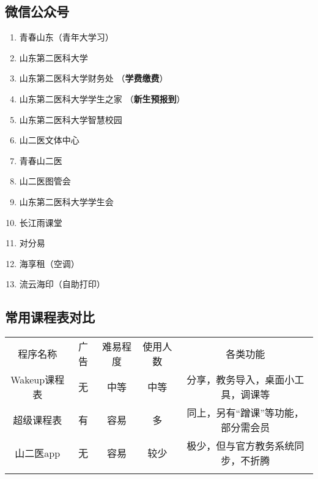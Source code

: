 {\begin{minipage}{.5\textwidth}
        \subsection[微信公众号]{微信公众号}
        \begin{enumerate}
            \item 青春山东（青年大学习）
            \item 山东第二医科大学
            \item 山东第二医科大学财务处%
                  （\textbf{学费缴费}）
            \item 山东第二医科大学学生之家%
                  （\textbf{新生预报到}）
            \item 山东第二医科大学智慧校园
            \item 山二医文体中心
            \item 青春山二医
            \item 山二医图管会
            \item 山东第二医科大学学生会
            \item 长江雨课堂
            \item 对分易
            \item 海享租（空调）
            \item 流云海印（自助打印）
        \end{enumerate}

    \end{minipage}
    \vspace*{-1em}
}

\subsection[常用课程表对比]{常用课程表对比}
\label{schedule}
\begin{center}
    \centering
    \begin{tabular}{|c|c|c|c|c|}
        \Xhline{1.2pt}
        程序名称      & 广告 & 难易程度 & 使用人数 & 各类功能               \\
        \Xhline{1.2pt}
        Wakeup课程表 & 无  & 中等   & 中等   & 分享，教务导入，桌面小工具，调课等  \\
        \hline
        超级课程表     & 有  & 容易   & 多    & 同上，另有“蹭课”等功能，部分需会员 \\
        \hline
        山二医app    & 无  & 容易   & 较少   & 极少，但与官方教务系统同步，不折腾  \\
        \Xhline{1.2pt}
    \end{tabular}
\end{center}

